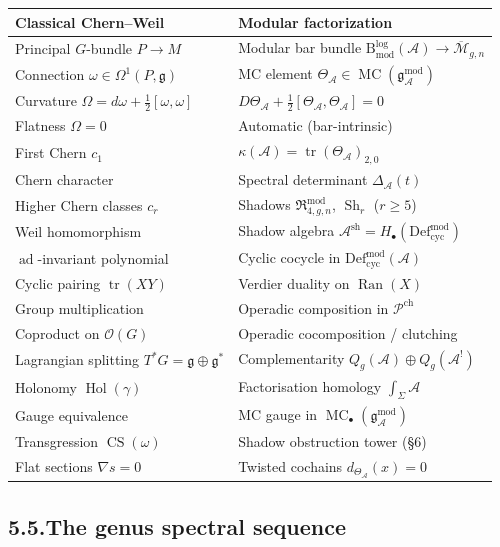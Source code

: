 \documentclass[11pt]{report}
\theoremstyle{definition}
\theoremstyle{remark}
\providecommand{\cA}{\mathcal{A}}
\providecommand{\cM}{\mathcal{M}}
\providecommand{\cO}{\mathcal{O}}
\providecommand{\cP}{\mathcal{P}}
\providecommand{\fg}{\mathfrak{g}}
\providecommand{\gAmod}{\mathfrak{g}^{\mathrm{mod}}_\cA}
\providecommand{\Defcyc}{\mathrm{Def}_{\mathrm{cyc}}}
\numberwithin{equation}{section}
\begin{document}
\begin{center}
\renewcommand{\arraystretch}{1.25}
\begin{tabular}{ll}
\textbf{Classical Chern--Weil} & \textbf{Modular factorization}\\
\hline
Principal $G$-bundle $P\to M$ & Modular bar bundle $\mathrm B^{\log}_{\mathrm{mod}}(\cA)\to\overline{\cM}_{g,n}$\\[1pt]
Connection $\omega\in\Omega^1(P,\fg)$ & MC element $\Theta_\cA\in\operatorname{MC}(\gAmod)$\\[1pt]
Curvature $\Omega=d\omega+\tfrac12[\omega,\omega]$ & $D\Theta_\cA+\tfrac12[\Theta_\cA,\Theta_\cA]=0$\\[1pt]
Flatness $\Omega=0$ & Automatic (bar-intrinsic)\\[1pt]
First Chern $c_1$ & $\kappa(\cA)=\operatorname{tr}(\Theta_\cA)_{2,0}$\\[1pt]
Chern character & Spectral determinant $\Delta_\cA(t)$\\[1pt]
Higher Chern classes $c_r$ & Shadows $\mathfrak R^{\mathrm{mod}}_{4,g,n}$, $\operatorname{Sh}_r$ ($r\ge 5$)\\[1pt]
Weil homomorphism & Shadow algebra $\cA^{\mathrm{sh}}=H_\bullet(\Defcyc^{\mathrm{mod}})$\\[1pt]
$\operatorname{ad}$-invariant polynomial & Cyclic cocycle in $\Defcyc^{\mathrm{mod}}(\cA)$\\[1pt]
Cyclic pairing $\operatorname{tr}(XY)$ & Verdier duality on $\operatorname{Ran}(X)$\\[1pt]
Group multiplication & Operadic composition in $\cP^{\mathrm{ch}}$\\[1pt]
Coproduct on $\cO(G)$ & Operadic cocomposition / clutching\\[1pt]
Lagrangian splitting $T^*G=\fg\oplus\fg^*$ & Complementarity $Q_g(\cA)\oplus Q_g(\cA^!)$\\[1pt]
Holonomy $\operatorname{Hol}(\gamma)$ & Factorisation homology $\int_\Sigma\cA$\\[1pt]
Gauge equivalence & MC gauge in $\operatorname{MC}_\bullet(\gAmod)$\\[1pt]
Transgression $\operatorname{CS}(\omega)$ & Shadow obstruction tower (\S6)\\[1pt]
Flat sections $\nabla s=0$ & Twisted cochains $d_{\Theta_\cA}(x)=0$
\end{tabular}
\end{center}

\subsection*{5.5.\enspace The genus spectral sequence}
\end{document}
